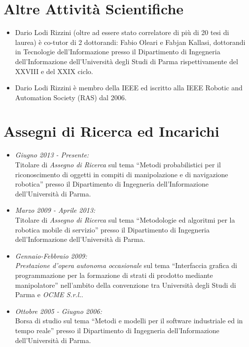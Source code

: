 \documentclass[11pt]{article}
\newcommand{\ITEMDATE}[1]{\item \textit{#1:}\\}
\begin{document}

\section*{Altre Attivit\`a Scientifiche}

\begin{itemize}
\item Dario Lodi Rizzini (oltre ad essere stato correlatore di pi\`u di 20 tesi di laurea) \`e co-tutor di 2 dottorandi: Fabio Oleari e Fabjan Kallasi, dottorandi in Tecnologie dell'Informazione presso il Dipartimento di Ingegneria dell'Informazione dell'Universit\`a degli Studi di Parma rispettivamente del XXVIII e del XXIX ciclo. 
\item Dario Lodi Rizzini \`e membro della IEEE ed iscritto alla IEEE Robotic and Automation Society (RAS) dal 2006. 
\end{itemize}


\section*{Assegni di Ricerca ed Incarichi}

\begin{itemize}
\ITEMDATE{Giugno 2013 - Presente} 
Titolare di \emph{Assegno di Ricerca} sul tema 
``Metodi probabilistici per il riconoscimento di oggetti in compiti di manipolazione e di navigazione robotica''
presso il Dipartimento di Ingegneria dell'Informazione dell'Universit\`a di Parma.

\ITEMDATE{Marzo 2009 - Aprile 2013} 
Titolare di \emph{Assegno di Ricerca} sul tema ``Metodologie ed algoritmi per la robotica mobile di servizio''
presso il Dipartimento di Ingegneria dell'Informazione dell'Universit\`a di Parma.

\ITEMDATE{Gennaio-Febbraio 2009} 
\emph{Prestazione d'opera autonoma occasionale} sul tema ``Interfaccia grafica di 
programmazione per la formazione di strati di prodotto mediante manipolatore'' 
nell'ambito della convenzione tra Universit\`a degli Studi di Parma e \emph{OCME S.r.l.}.

\ITEMDATE{Ottobre 2005 - Giugno 2006}
Borsa di studio sul tema ``Metodi e modelli per il software 
industriale ed in tempo reale'' presso %
il Dipartimento di Ingegneria dell'Informazione dell'Universit\`a di Parma.

\end{itemize}
\end{document}
